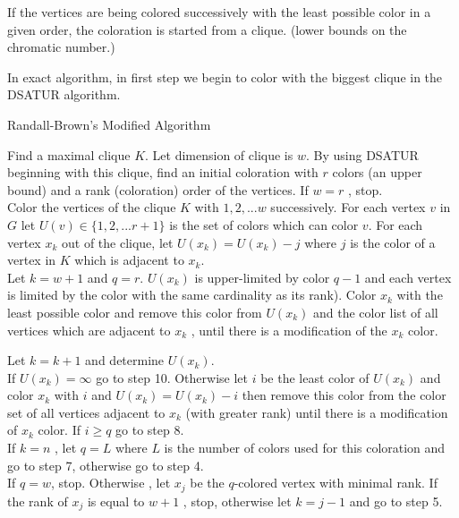 \documentclass{beamer}
\begin{document}
{\begin{defi}
If the vertices are being colored successively with the least possible color in a
given order, the coloration is started from a clique. (lower bounds on the 
chromatic number.)

In exact algorithm, in first step we begin to color with the biggest clique in the DSATUR algorithm.



\newpage
{}
\begin{algorithm}[H]
\SetAlgoLined
\DontPrintSemicolon
  \caption{Randall-Brown's Modified Algorithm\cite{randall}}
  
{\small  Find a maximal clique $K$. Let dimension of clique is $w$. By using DSATUR
beginning with this clique, find an initial coloration with $r$ colors (an
upper bound) and a rank (coloration) order of the vertices. If $w = r$ , stop.\\

 Color the vertices of the clique $K$ with $1, 2, . . . w$ successively. For each
vertex $v$ in $G$ let $U(v) \in \{1, 2, . . . r + 1\}$ is the set of colors which can color
$v$. For each vertex $x_k$ out of the clique, let $U(x_k) = U(x_k) - j$ where $j$ is
the color of a vertex in $K$ which is adjacent to $x_k$.\\

 Let $k = w + 1$ and $q = r$.\newline
$U(x_k)$ is upper-limited by color $q - 1$ and each vertex is limited by the color
with the same cardinality as its rank). Color $x_k$ with the least possible
color and remove this color from $U(x_k)$ and the color list of all vertices
which are adjacent to $x_k$ , until there is a modification of the $x_k$ color.

 Let $k = k + 1$ and determine $U(x_k)$.\\

 If $U(x_k) = \infty$ go to step 10. Otherwise let $i$ be the least color of $U(x_k)$ and
color $x_k$ with $i$ and $U(x_k) = U(x_k) - i$ then remove this color from the
color set of all vertices adjacent to $x_k$ (with greater rank) until there is a
modification of $x_k$ color. If $i \geq q$ go to step 8.\\

 If $k = n$ , let $q = L$ where $L$ is the number of colors used for this coloration
and go to step 7, otherwise go to step 4.\\

 If $q = w$, stop. Otherwise , let $x_j$ be the $q$-colored vertex with minimal
rank. If the rank of $x_j$ is equal to $w + 1$ , stop, otherwise let $k = j - 1$ and
go to step 5.\\

}
\end{algorithm}
\end{defi}}
\end{document}

